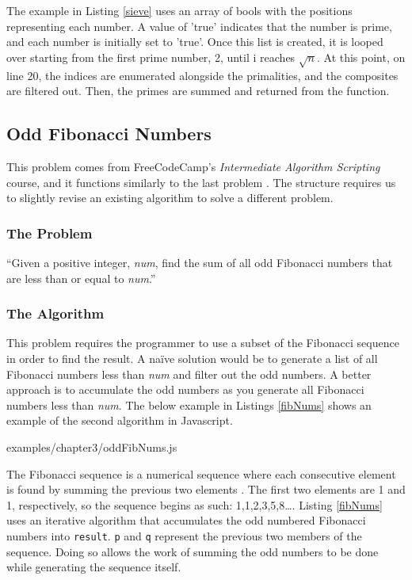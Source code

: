 \documentclass[12pt, oneside, a4paper]{book}
\begin{document}
         The example in Listing \ref{sieve} uses an array of bools with the positions representing each number.
         A value of 'true' indicates that the number is prime, and each number is initially set to 'true'.
         Once this list is created, it is looped over starting from the first prime number, 2, until i reaches $\sqrt{n}$.
         At this point, on line 20, the indices are enumerated alongside the primalities, and the composites are filtered out.
         Then, the primes are summed and returned from the function.

         \subsection{Odd Fibonacci Numbers}
         This problem comes from FreeCodeCamp's \textit{Intermediate Algorithm Scripting} course, and it functions similarly to the last problem \autocite{freecodecampLearnIntermediateAlgorithm}.
         The structure requires us to slightly revise an existing algorithm to solve a different problem.

         \subsubsection{The Problem}
         ``Given a positive integer, \textit{num}, find the sum of all odd Fibonacci numbers that are less than or equal to \textit{num}.''

         \subsubsection{The Algorithm}
         This problem requires the programmer to use a subset of the Fibonacci sequence in order to find the result.
         A naïve solution would be to generate a list of all Fibonacci numbers less than \textit{num} and filter out the odd numbers.
         A better approach is to accumulate the odd numbers as you generate all Fibonacci numbers less than \textit{num}.
         The below example in Listings \ref{fibNums} shows an example of the second algorithm in Javascript.

         
         {examples/chapter3/oddFibNums.js}

         The Fibonacci sequence is a numerical sequence where each consecutive element is found by summing the previous two elements \autocite{parshallFibonacciSequence}.
         The first two elements are 1 and 1, respectively, so the sequence begins as such: 1,1,2,3,5,8\ldots.
         Listing \ref{fibNums} uses an iterative algorithm that accumulates the odd numbered Fibonacci numbers into \lstinline!result!.
         \lstinline!p! and \lstinline!q! represent the previous two members of the sequence.
         Doing so allows the work of summing the odd numbers to be done while generating the sequence itself.
\end{document}
